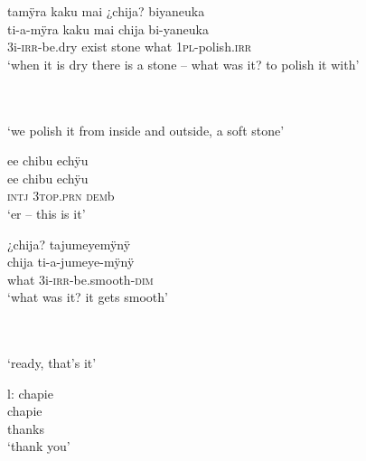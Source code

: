 \newpage

\ea%
\begingl 
\glpreamble tamÿra kaku mai ¿chija? biyaneuka\\
\gla ti-a-mÿra kaku mai chija bi-yaneuka\\ 
\glb 3i-\textsc{irr}-be.dry exist stone what 1\textsc{pl}-polish.\textsc{irr}\\ 
\glft ‘when it is dry there is a stone – what was it? to polish it with’\\ 
\endgl
\xe

\ea%
\begingl 
{}\\
\\
\glft ‘we polish it from inside and outside, a soft stone’
\endgl
\xe

\ea%
\begingl 
\glpreamble ee chibu echÿu\\
\gla ee chibu echÿu\\ 
\glb \textsc{intj} 3\textsc{top.prn} \textsc{dem}b\\ 
\glft ‘er – this is it’\\ 
\endgl
\xe

\ea%
\begingl 
\glpreamble ¿chija? tajumeyemÿnÿ\\
\gla chija ti-a-jumeye-mÿnÿ\\ 
\glb what 3i-\textsc{irr}-be.smooth-\textsc{dim}\\ 
\glft ‘what was it? it gets smooth’\\ 
\endgl
\xe

\ea%
\begingl 
{}\\
\\
\glft ‘ready, that’s it’
\endgl
\xe

\ea%
\begingl 
\glpreamble \textup{l:} chapie\\
\gla chapie \\ 
\glb thanks\\ 
\glft ‘thank you’\\ 
\endgl
\xe
%
%
%
%
%
%

